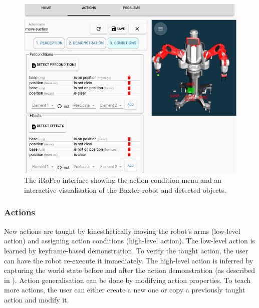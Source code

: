 \begin{figure}[h]
	\includegraphics[width=0.96\linewidth]{figures/gui.png}
	\caption{The iRoPro interface showing the action condition menu and an interactive visualisation of the Baxter robot and detected objects.}\label{fig:gui-action-3}%
\end{figure}

\subsubsection*{Actions} New actions are taught by kinesthetically moving the robot's arms (low-level action) and assigning action conditions (high-level action).
The low-level action is learned %
by keyframe-based demonstration.
To verify the taught action, the user can have the robot re-execute it immediately.
The high-level action is inferred by capturing the world state before and after the action demonstration (as described in ).
Action generalisation can be done by modifying action properties.
To teach more actions, the user can either create a new one or copy a previously taught action and modify it.
